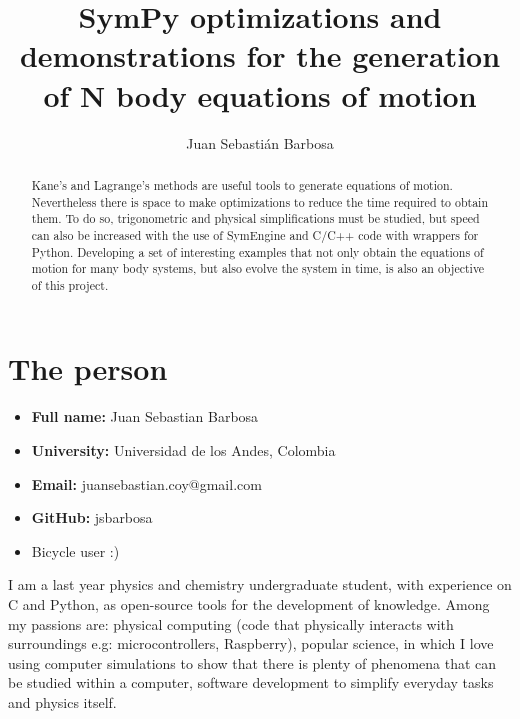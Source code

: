 \documentclass[12pt]{article}
\title{SymPy optimizations and demonstrations for the generation of N body equations of motion}
\author{Juan Sebasti\'an Barbosa}
\begin{document}
\maketitle

\begin{abstract}
	Kane's and Lagrange's methods are useful tools to generate equations of motion. Nevertheless there is space to make optimizations to reduce the time required to obtain them. To do so, trigonometric and physical simplifications must be studied, but speed can also be increased with the use of SymEngine and C/C++ code with wrappers for Python. Developing a set of interesting examples that not only obtain the equations of motion for many body systems, but also evolve the system in time, is also an objective of this project.
\end{abstract}

\section{The person}
\begin{itemize}
	\item \textbf{Full name:} Juan Sebastian Barbosa
	\item \textbf{University:} Universidad de los Andes, Colombia
	\item \textbf{Email:} juansebastian.coy@gmail.com
	\item \textbf{GitHub:} jsbarbosa
	\item Bicycle user :)
\end{itemize}

I am a last year physics and chemistry undergraduate student, with experience on C and Python, as open-source tools for the development of knowledge. Among my passions are: physical computing (code that physically interacts with surroundings e.g: microcontrollers, Raspberry), popular science, in which I love using computer simulations to show that there is plenty of phenomena that can be studied within a computer, software development to simplify everyday tasks and physics itself.
\end{document}
